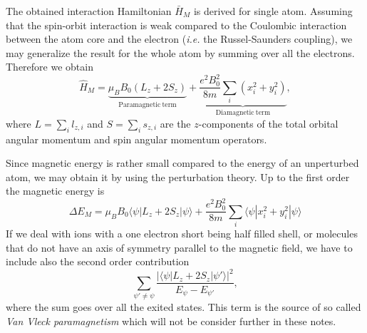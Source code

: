The obtained interaction Hamiltonian $\bar{H}_M$ is derived for single atom. Assuming that the spin-orbit interaction is weak compared to the Coulombic interaction between the atom core and the electron (\emph{i.e.} the Russel-Saunders coupling), we may generalize the result for the whole atom by summing over all the electrons. Therefore we obtain
\begin{equation}
\hat{H}_M = \underbrace{\mu_B B_0 (L_z + 2 S_z)}_{\mathrm{Paramagnetic \ term}} + \underbrace{\frac{e^2 B_0^2}{8 m} \sum_i (x_i^2 + y_i^2)}_{\mathrm{Diamagnetic \ term}},
\end{equation}
where $L = \sum_i l_{z,i}$ and $S = \sum_i s_{z,i}$ are the $z$-components of the total orbital angular momentum and spin angular momentum operators.

Since magnetic energy is rather small compared to the energy of an unperturbed atom, we may obtain it by using the perturbation theory. Up to the first order the magnetic energy is
\begin{equation}\label{eq:E_magnetic}
\Delta E_M = \mu_B B_0 \langle \psi | L_z + 2 S_z | \psi \rangle 
+ \frac{e^2 B_0^2}{8 m}\sum_i \langle \psi | x_i^2 + y_i^2 | \psi \rangle
\end{equation} 
If we deal with ions with a one electron short being half filled shell, or molecules that do not have an axis of symmetry parallel to the magnetic field, we have to include also the second order contribution
\begin{equation}
\sum_{\psi' \neq \psi} \frac{|\langle \psi | L_z + 2 S_z | \psi' \rangle|^2}{E_\psi - E_{\psi'}},
\end{equation}
where the sum goes over all the exited states. This term is the source of so called \emph{Van Vleck paramagnetism} which will not be consider further in these notes.

